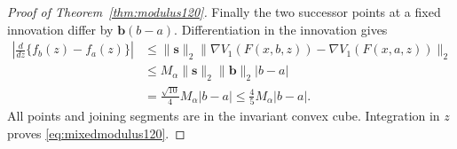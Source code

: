 \begin{proof}[Proof of Theorem~\ref{thm:modulus120}]
Finally the two successor points at a fixed innovation differ by
$\boldsymbol b(b-a)$.  Differentiation in the innovation gives
\begin{align*}
 \left|\frac{d}{dz}\{f_b(z)-f_a(z)\}\right|
 &\le\|\boldsymbol s\|_2
    \|\nabla V_1(F(x,b,z))-\nabla V_1(F(x,a,z))\|_2\\
 &\le M_\alpha\|\boldsymbol s\|_2\|\boldsymbol b\|_2|b-a|\\
 &=\frac{\sqrt{10}}4M_\alpha|b-a|
 \le\frac45M_\alpha|b-a|.
\end{align*}
All points and joining segments are in the invariant convex cube.
Integration in $z$ proves \eqref{eq:mixedmodulus120}.
\end{proof}

